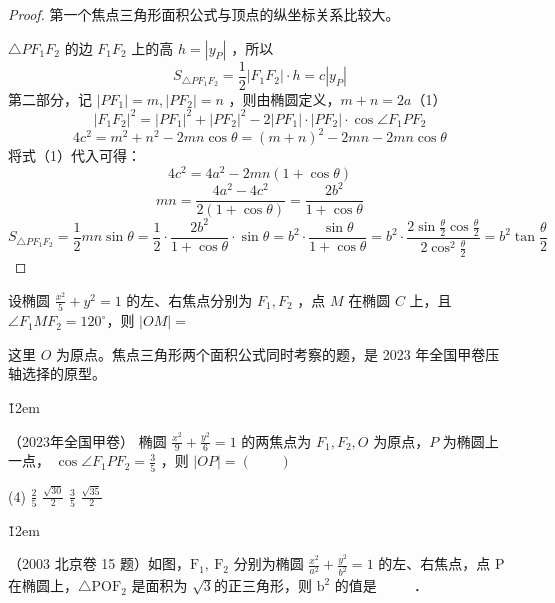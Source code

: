 \begin{proof}
    第一个焦点三角形面积公式与顶点的纵坐标关系比较大。

    $\triangle P F_1 F_2$ 的边 $F_1 F_2$ 上的高 $h=\left|y_P\right|$ ，所以
    $$
        S_{\triangle P F_1 F_2}=\frac{1}{2}\left|F_1 F_2\right| \cdot h=c\left|y_P\right|
    $$
    第二部分，记 $\left|P F_1\right|=m,\left|P F_2\right|=n$ ，则由椭圆定义，$m+n=2 a$（1）
    $$
        \left|F_1 F_2\right|^2=\left|P F_1\right|^2+\left|P F_2\right|^2-2\left|P F_1\right| \cdot\left|P F_2\right| \cdot \cos \angle F_1 P F_2
    $$
    $$
        4 c^2=m^2+n^2-2 m n \cos \theta=(m+n)^2-2 m n-2 m n \cos \theta
    $$
    将式（1）代入可得：
    $$
        4 c^2=4 a^2-2 m n(1+\cos \theta)
    $$
    $$
        m n=\frac{4 a^2-4 c^2}{2(1+\cos \theta)}=\frac{2 b^2}{1+\cos \theta}
    $$
    $$
        S_{\triangle P F_1 F_2}=\frac{1}{2} m n \sin \theta=\frac{1}{2} \cdot \frac{2 b^2}{1+\cos \theta} \cdot \sin \theta=b^2 \cdot \frac{\sin \theta}{1+\cos \theta}=b^2 \cdot \frac{2 \sin \frac{\theta}{2} \cos \frac{\theta}{2}}{2 \cos ^2 \frac{\theta}{2}}=b^2 \tan \frac{\theta}{2}
    $$
\end{proof}

\begin{problem}
设椭圆 $\frac{x^2}{5}+y^2=1$ 的左、右焦点分别为 $F_1, F_2$ ，点 $M$ 在椭圆 $C$ 上，且 $\angle F_1 M F_2=120^{\circ}$，则 $|O M|=$
\end{problem}

\begin{tips}
    这里 $O$ 为原点。焦点三角形两个面积公式同时考察的题，是 2023 年全国甲卷压轴选择的原型。
\end{tips}

\v{12em}

\begin{problem}
（2023年全国甲卷）
椭圆 $\frac{x^2}{9}+\frac{y^2}{6}=1$ 的两焦点为 $F_1, F_2, O$ 为原点，$P$ 为椭圆上一点， $\cos \angle F_1 P F_2=\frac{3}{5}$ ，则 $|O P|=(\hspace{2em})$
\begin{tasks}(4)
    \task $\frac{2}{5}$
    \task $\frac{\sqrt{30}}{2}$
    \task $\frac{3}{5}$
    \task $\frac{\sqrt{35}}{2}$
\end{tasks}
\end{problem}

\v{12em}

\begin{example}
    （2003 北京卷 15 题）如图，$\mathrm{F}_1, \mathrm{~F}_2$ 分别为椭圆 $\frac{x^2}{a^2}+\frac{y^2}{b^2}=1$ 的左、右焦点，点 P 在椭圆上，$\triangle \mathrm{POF}_2$ 是面积为 $\sqrt{3}$的正三角形，则 $\mathrm{b}^2$ 的值是 \underline{$\qquad$} ．
\end{example}

